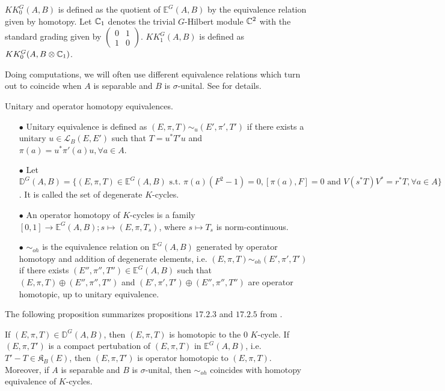 \begin{definition} $KK_0^G(A,B)$ is defined as the quotient of $\mathbb E^G(A,B)$ by the equivalence relation given by homotopy. Let $\mathbb C_1$ denotes the trivial $G$-Hilbert module $\mathbb C^2$ with the standard grading given by $\begin{pmatrix}0 & 1 \\ 1 & 0 \end{pmatrix}$. $KK_1^G(A,B)$ is defined as $KK_0^G(A,B \otimes \mathbb C_1)$. 
\end{definition}

Doing computations, we will often use different equivalence relations which turn out to coincide when $A$ is separable and $B$ is $\sigma$-unital. See \cite{blackadar} for details.

\begin{definition} Unitary and operator homotopy equivalences.
\begin{itemize}
\item[$\bullet$]  Unitary equivalence is defined as $(E,\pi,T)\sim_{u} (E',\pi',T')$ if there exists a unitary $u\in\mathcal L_B(E,E')$ such that $T = u^* T' u$ and $\pi(a) = u^* \pi'(a) u , \forall a\in A$.
\item[$\bullet$] Let $\mathbb D^G(A,B) = \{(E,\pi,T) \in\mathbb E^G(A,B) \text{ s.t. } \pi(a)(F^2-1) = 0, [\pi(a),F]=0 \text{ and }V(s^*T)V^* = r^*T,\forall a\in A \}$. It is called the set of degenerate $K$-cycles.   
\item[$\bullet$] An operator homotopy of $K$-cycles is a family $[0,1]\rightarrow \mathbb E^G(A,B) ; s\mapsto (E,\pi,T_s)$, where $s\mapsto T_s$ is norm-continuous. 
\item[$\bullet$] $\sim_{oh}$ is the equivalence relation on $\mathbb E^G(A,B)$ generated by operator homotopy and addition of degenerate elements, i.e. $(E,\pi,T)\sim_{oh} (E',\pi',T')$ if there exists $(E'',\pi'',T'')\in\mathbb E^{G}(A,B)$ such that $(E,\pi,T)\oplus (E'',\pi'',T'')$ and $(E',\pi',T')\oplus (E'',\pi'',T'')$ are operator homotopic, up to unitary equivalence.
\end{itemize}
\end{definition}

The following proposition summarizes propositions $17.2.3$ and $17.2.5$ from \cite{blackadar}. 
 
\begin{prop} If $(E,\pi,T)\in\mathbb D^G(A,B)$, then $(E,\pi,T)$ is homotopic to the $0$ $K$-cycle.
If $(E,\pi,T')$ is a compact pertubation of $(E,\pi,T)$ in $\mathbb E^G(A,B)$, i.e. $T'-T\in \mathfrak K_B(E)$, then $(E,\pi,T')$ is operator homotopic to $(E,\pi,T)$.\\
Moreover, if $A$ is separable and $B$ is $\sigma$-unital, then $\sim_{oh}$ coincides with homotopy equivalence of $K$-cycles.
\end{prop}

